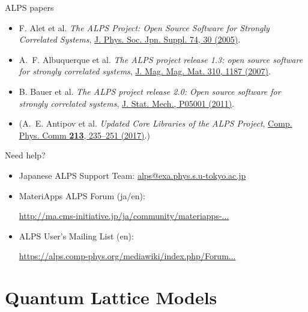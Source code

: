 \begin{frame}[t,fragile]{ALPS papers}
  \begin{itemize}
    \setlength{\itemsep}{1em}
  \item F. Alet et al. {\it The ALPS Project: Open Source Software for
    Strongly Correlated Systems}, \href{http://jpsj.ipap.jp/link?JPSJS/74S/30}{J. Phys. Soc. Jpn. Suppl. 74, 30 (2005)}.
  \item A.~F. Albuquerque et al. {\it The ALPS project release 1.3: open source software for strongly correlated systems}, \href{http://dx.doi.org/10.1016/j.jmmm.2006.10.304}{J. Mag. Mag. Mat. 310, 1187 (2007)}.
  \item B. Bauer et al. {\it The ALPS project release 2.0: Open source software for strongly correlated systems}, \href{http://iopscience.iop.org/1742-5468/2011/05/P05001}{J. Stat. Mech., P05001 (2011)}.
  \item (A.~E. Antipov et al. {\it Updated Core Libraries of the ALPS Project}, \href{http://dx.doi.org/10.1016/j.cpc.2016.12.009}{Comp. Phys. Comm {\bf 213}, 235--251 (2017)}.)
  \end{itemize}
\end{frame}

\begin{frame}[t,fragile]{Need help?}
  \begin{itemize}
    \setlength{\itemsep}{1em}
  \item Japanese ALPS Support Team: {\href{mailto:alps@exa.phys.s.u-tokyo.ac.jp}{alps@exa.phys.s.u-tokyo.ac.jp}}
  \item MateriApps ALPS Forum (ja/en):

    {\footnotesize \href{http://ma.cms-initiative.jp/ja/community/materiapps-messageboard/alps}{http://ma.cms-initiative.jp/ja/community/materiapps-...}}
  \item ALPS User's Mailing List (en):

    {\footnotesize \href{https://alps.comp-phys.org/mediawiki/index.php/Forum:Overview}{https://alps.comp-phys.org/mediawiki/index.php/Forum...}}
  \end{itemize}
\end{frame}

\section{Quantum Lattice Models}
\subsection*{\redb\whiteb\greenb}

